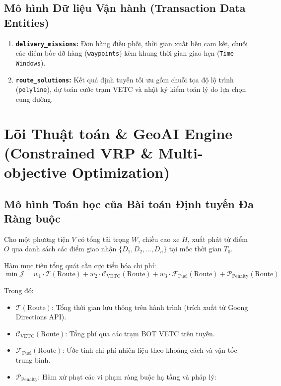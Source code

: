 \documentclass[11pt,a4paper]{article}
\begin{document}
\subsection{Mô hình Dữ liệu Vận hành (Transaction Data Entities)}
\begin{enumerate}
  \item \textbf{\texttt{delivery\_missions}:} Đơn hàng điều phối, thời gian xuất bến cam kết, chuỗi các điểm bốc dỡ hàng (\texttt{waypoints}) kèm khung thời gian giao hẹn (\texttt{Time Windows}).
  \item \textbf{\texttt{route\_solutions}:} Kết quả định tuyến tối ưu gồm chuỗi tọa độ lộ trình (\texttt{polyline}), dự toán cước trạm VETC và nhật ký kiểm toán lý do lựa chọn cung đường.
\end{enumerate}

\section{Lõi Thuật toán \& GeoAI Engine (Constrained VRP \& Multi-objective Optimization)}

\subsection{Mô hình Toán học của Bài toán Định tuyến Đa Ràng buộc}
Cho một phương tiện $V$ có tổng tải trọng $W$, chiều cao xe $H$, xuất phát từ điểm $O$ qua danh sách các điểm giao nhận $\{D_1, D_2, \dots, D_n\}$ tại mốc thời gian $T_0$.

Hàm mục tiêu tổng quát cần cực tiểu hóa chi phí:
\begin{equation}
  \min \mathcal{J} = w_1 \cdot \mathcal{T}(\text{Route}) + w_2 \cdot \mathcal{C}_{\text{VETC}}(\text{Route}) + w_3 \cdot \mathcal{F}_{\text{Fuel}}(\text{Route}) + \mathcal{P}_{\text{Penalty}}(\text{Route})
\end{equation}

Trong đó:
\begin{itemize}
  \item $\mathcal{T}(\text{Route})$: Tổng thời gian lưu thông trên hành trình (trích xuất từ Goong Directions API).
  \item $\mathcal{C}_{\text{VETC}}(\text{Route})$: Tổng phí qua các trạm BOT VETC trên tuyến.
  \item $\mathcal{F}_{\text{Fuel}}(\text{Route})$: Ước tính chi phí nhiên liệu theo khoảng cách và vận tốc trung bình.
  \item $\mathcal{P}_{\text{Penalty}}$: Hàm xử phạt các vi phạm ràng buộc hạ tầng và pháp lý:
\end{itemize}
\end{document}
